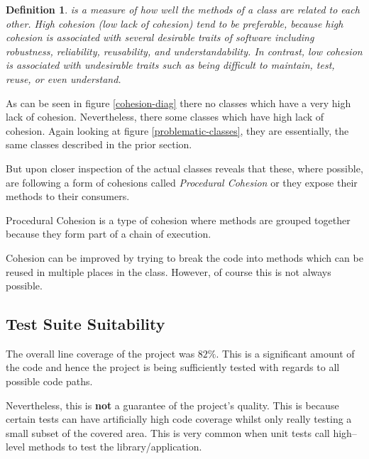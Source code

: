 \documentclass[12pt]{article}
\DeclareRobustCommand{\ul}[1]{%
	\uline{\phantom{#1}}%
	\llap{\contour{white}{#1}}%
}
\newtheorem*{definition}{Definition}
\begin{document}
\begin{definition}
    \ul{Cohesion} is a measure of how well the methods of
    a class are related to each other. High cohesion (low lack
    of cohesion) tend to be preferable, because high cohesion is
    associated with several desirable traits of software
    including robustness, reliability, reusability, and
    understandability. In contrast, low cohesion is associated
    with undesirable traits such as being difficult to maintain,
    test, reuse, or even understand.
\end{definition}

As can be seen in figure \ref{cohesion-diag} there no classes
which have a very high lack of cohesion. Nevertheless, there
some classes which have high lack of cohesion. Again looking at
figure \ref{problematic-classes}, they are essentially, the same
classes described in the prior section.

But upon closer inspection of the actual classes reveals that
these, where possible, are following a form of cohesions called
\emph{Procedural Cohesion} or they expose their methods to their
consumers.

Procedural Cohesion is a type of cohesion where methods are
grouped together because they form part of a chain of execution.

Cohesion can be improved by trying to break the code into
methods which can be reused in multiple places in the class.
However, of course this is not always possible.

\subsection{Test Suite Suitability}

The overall line coverage of the project was $82\%$. This is a
significant amount of the code and hence the project is being
sufficiently tested with regards to all possible code paths.

Nevertheless, this is \textbf{not} a guarantee of the project's
quality. This is because certain tests can have artificially
high code coverage whilst only really testing a small subset of
the covered area. This is very common when unit tests call
high--level methods to test the library/application.
\end{document}
